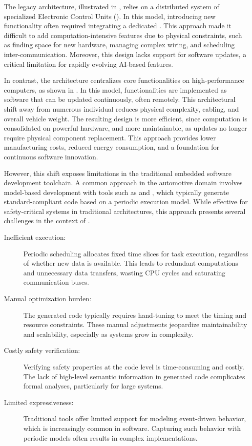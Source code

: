 The legacy architecture, illustrated in , relies on a distributed
system of specialized Electronic Control Units (\ecus). In this model, introducing new functionality
often required integrating a dedicated \ecu. This approach made it difficult to add
computation-intensive features due to physical constraints, such as finding space for new hardware,
managing complex wiring, and scheduling inter-\ecu communication. Moreover, this design lacks
support for software updates, a critical limitation for rapidly evolving AI-based features.

In contrast, the \sdv architecture centralizes core functionalities on high-performance computers,
as shown in . In this model, functionalities are implemented as
software that can be updated continuously, often remotely. This architectural shift away from
numerous individual \ecus reduces physical complexity, cabling, and overall vehicle weight. The
resulting design is more efficient, since computation is consolidated on powerful hardware, and more
maintainable, as updates no longer require physical component replacement. This approach provides
lower manufacturing costs, reduced energy consumption, and a foundation for continuous software
innovation.

However, this shift exposes limitations in the traditional embedded software development toolchain.
A common approach in the automotive domain involves model-based development with tools such as
\Simulink and \Stateflow, which typically generate standard-compliant \Ci code based on a periodic
execution model. While effective for safety-critical systems in traditional architectures, this
approach presents several challenges in the context of \sdv.
%
\begin{description}
    \item[Inefficient execution:] Periodic scheduling allocates fixed time slices for task
          execution, regardless of whether new data is available. This leads to redundant
          computations and unnecessary data transfers, wasting CPU cycles and saturating
          communication buses.

    \item[Manual optimization burden:] The generated \Ci code typically requires hand-tuning to meet
          the timing and resource constraints. These manual adjustments jeopardize maintainability
          and scalability, especially as systems grow in complexity.

    \item[Costly safety verification:] Verifying safety properties at the \Ci code level is
          time-consuming and costly. The lack of high-level semantic information in generated code
          complicates formal analyses, particularly for large systems.

    \item[Limited expressiveness:] Traditional tools offer limited support for modeling event-driven
          behavior, which is increasingly common in \sdv software. Capturing such behavior with
          periodic models often results in complex implementations.
\end{description}

